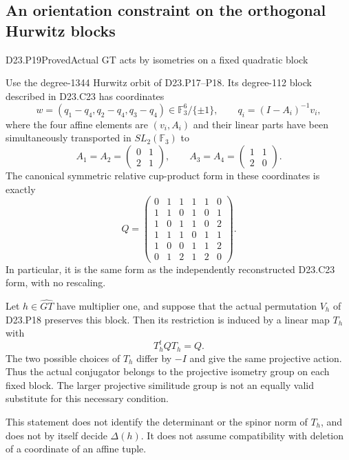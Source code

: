 \subsection{An orientation constraint on the orthogonal Hurwitz blocks}

\begin{statement}{D23.P19}{Proved}{Actual GT acts by isometries on a fixed quadratic block}
\end{statement}
Use the degree-1344 Hurwitz orbit of D23.P17--P18. Its
degree-112 block described in D23.C23 has coordinates
\[
 w=(q_1-q_4,q_2-q_4,q_3-q_4)\in\mathbb F_3^6/\{\pm1\},
 \qquad q_i=(I-A_i)^{-1}v_i,
\]
where the four affine elements are $(v_i,A_i)$ and their
linear parts have been simultaneously transported in
$SL_2(\mathbb F_3)$ to
\[
 A_1=A_2=\begin{pmatrix}0&1\\2&1\end{pmatrix},\qquad
 A_3=A_4=\begin{pmatrix}1&1\\2&0\end{pmatrix}.
 \tag{D23.P19.1}
\]
The canonical symmetric relative cup-product form in these
coordinates is exactly
\[
 Q=\begin{pmatrix}
 0&1&1&1&1&0\\
 1&1&0&1&0&1\\
 1&0&1&1&0&2\\
 1&1&1&0&1&1\\
 1&0&0&1&1&2\\
 0&1&2&1&2&0
 \end{pmatrix}.                                            \tag{D23.P19.2}
\]
In particular, it is the same form as the independently
reconstructed D23.C23 form, with no rescaling.

Let $h\in\widehat{GT}$ have multiplier one, and suppose that
the actual permutation $V_h$ of D23.P18 preserves this block.
Then its restriction is induced by a linear map $T_h$ with
\[
                    T_h^tQT_h=Q.                          \tag{D23.P19.3}
\]
The two possible choices of $T_h$ differ by $-I$ and give the
same projective action. Thus the actual conjugator belongs
to the projective isometry group on each fixed block. The
larger projective similitude group is not an equally valid
substitute for this necessary condition.

This statement does not identify the determinant or the
spinor norm of $T_h$, and does not by itself decide
$\Delta(h)$. It does not assume compatibility with deletion
of a coordinate of an affine tuple.

